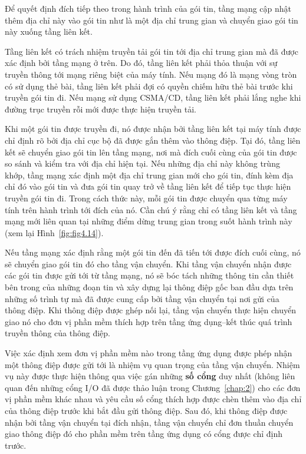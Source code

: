 Để quyết định đích tiếp theo trong hành trình của gói tin, tầng mạng cập nhật thêm địa chỉ
này vào gói tin như là một địa chỉ trung gian và chuyển giao gói tin này xuống tầng liên
kết.

Tầng liên kết có trách nhiệm truyền tải gói tin tới địa chỉ trung gian mà đã được xác định
bởi tầng mạng ở trên. Do đó, tầng liên kết phải thỏa thuận với sự truyền thông tới mạng
riêng biệt của máy tính. Nếu mạng đó là mạng vòng tròn có sử dụng thẻ bài, tầng liên kết
phải đợi có quyền chiếm hữu thẻ bài trước khi truyền gói tin đi. Nếu mạng sử dụng CSMA/CD,
tầng liên kết phải lắng nghe khi đường trục truyền rỗi mới được thực hiện truyền tải.

Khi một gói tin được truyền đi, nó được nhận bởi tầng liên kết tại máy tính được chỉ định
rõ bởi địa chỉ cục bộ đã được gắn thêm vào thông điệp. Tại đó, tầng liên kết sẽ chuyển
giao gói tin lên tầng mạng, nơi mà đích cuối cùng của gói tin được so sánh và kiểm tra với
địa chỉ hiện tại. Nếu những địa chỉ này không trùng khớp, tầng mạng xác định một địa chỉ
trung gian mới cho gói tin, đính kèm địa chỉ đó vào gói tin và đưa gói tin quay trở về
tầng liên kết để tiếp tục thực hiện truyền gói tin đi. Trong cách thức này, mỗi gói tin
được chuyển qua từng máy tính trên hành trình tới đích của nó. Cần chú ý rằng chỉ có tầng
liên kết và tầng mạng mới liên quan tại những điểm dừng trung gian trong suốt hành trình
này (xem lại Hình~\ref{fig:fig4.14}).

Nếu tầng mạng xác định rằng một gói tin đến đã tiến tới được đích cuối cùng, nó sẽ chuyển
giao gói tin đó cho tầng vận chuyển. Khi tầng vận chuyển nhận được các gói tin được gửi
tới từ tầng mạng, nó sẽ bóc tách những thông tin cần thiết bên trong của những đoạn tin và
xây dựng lại thông điệp gốc ban đầu dựa trên những số trình tự mà đã được cung cấp bởi
tầng vận chuyển tại nơi gửi của thông điệp. Khi thông điệp được ghép nối lại, tầng vận
chuyển thực hiện chuyển giao nó cho đơn vị phần mềm thích hợp trên tầng ứng dụng--kết thúc
quá trình truyền thông của thông điệp.


Việc xác định xem đơn vị phần mềm nào trong tầng ứng dụng được phép nhận một thông điệp
được gửi tới là nhiệm vụ quan trọng của tầng vận chuyển. Nhiệm vụ này được thực hiện thông
qua việc gán những \textbf{số cổng} duy nhất (không liên quan đến những cổng I/O đã được
thảo luận trong Chương~\ref{chap:2}) cho các đơn vị phần mềm khác nhau và yêu cầu số cổng thích
hợp được chèn thêm vào địa chỉ của thông điệp trước khi bắt đầu gửi thông điệp. Sau đó,
khi thông điệp được nhận bởi tầng vận chuyển tại đích nhận, tầng vận chuyển chỉ đơn thuần
chuyển giao thông điệp đó cho phần mềm trên tầng ứng dụng có cổng được chỉ định trước.

